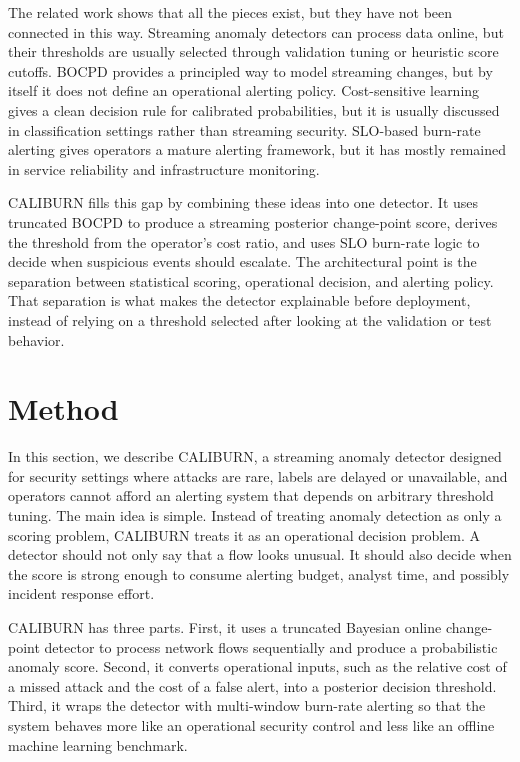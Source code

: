 \documentclass[preprint,12pt,authoryear]{elsarticle}
\newcommand{\caliburn}{CALIBURN}
\begin{document}
The related work shows that all the pieces exist, but they have not been connected in this way. Streaming anomaly detectors can process data online, but their thresholds are usually selected through validation tuning or heuristic score cutoffs. BOCPD provides a principled way to model streaming changes, but by itself it does not define an operational alerting policy. Cost-sensitive learning gives a clean decision rule for calibrated probabilities, but it is usually discussed in classification settings rather than streaming security. SLO-based burn-rate alerting gives operators a mature alerting framework, but it has mostly remained in service reliability and infrastructure monitoring.

\caliburn{} fills this gap by combining these ideas into one detector. It uses truncated BOCPD to produce a streaming posterior change-point score, derives the threshold from the operator's cost ratio, and uses SLO burn-rate logic to decide when suspicious events should escalate. The architectural point is the separation between statistical scoring, operational decision, and alerting policy. That separation is what makes the detector explainable before deployment, instead of relying on a threshold selected after looking at the validation or test behavior.

\section{Method}
\label{sec:method}

In this section, we describe \caliburn{}, a streaming anomaly detector designed for security settings where attacks are rare, labels are delayed or unavailable, and operators cannot afford an alerting system that depends on arbitrary threshold tuning. The main idea is simple. Instead of treating anomaly detection as only a scoring problem, \caliburn{} treats it as an operational decision problem. A detector should not only say that a flow looks unusual. It should also decide when the score is strong enough to consume alerting budget, analyst time, and possibly incident response effort.

\caliburn{} has three parts. First, it uses a truncated Bayesian online change-point detector to process network flows sequentially and produce a probabilistic anomaly score. Second, it converts operational inputs, such as the relative cost of a missed attack and the cost of a false alert, into a posterior decision threshold. Third, it wraps the detector with multi-window burn-rate alerting so that the system behaves more like an operational security control and less like an offline machine learning benchmark.
\end{document}
